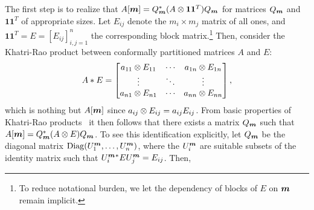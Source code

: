 \documentclass[11pt]{article}
\begin{document}
\vskip5pt
\noindent The first step is to realize that $A[\bm{m}] = Q_{\bm{m}}^*(A\otimes \bm{11}^T)Q_{\bm{m}}$ for matrices $Q_{\bm{m}}$ and $\bm{11}^T$ of appropriate sizes. Let $E_{ij}$ denote the $m_i \times m_j$ matrix of all ones, and $\bm{11}^T=E=[E_{ij}]_{i,j=1}^n$ the corresponding block matrix.\footnote{To reduce notational burden, we let the dependency of blocks of $E$ on $\bm{m}$ remain implicit.} Then, consider the Khatri-Rao product between conformally partitioned matrices $A$ and $E$:
\begin{equation}
  \label{eq:4}
  A \ast E =
  \begin{bmatrix}
    a_{11}\otimes E_{11} & \cdots  & a_{1n}\otimes E_{1n}\\
    \vdots & \ddots & \vdots \\
    a_{n1} \otimes E_{n1} & \cdots & a_{nn}\otimes E_{nn}
  \end{bmatrix},
\end{equation}
which is nothing but $A[\bm{m}]$ since $a_{ij}\otimes E_{ij} = a_{ij}E_{ij}$. From basic properties of Khatri-Rao products~\citep{liu2008} it then follows that there exists a matrix $Q_{\bm{m}}$ such that $A[\bm{m}]=Q_{\bm{m}}^*(A\otimes E)Q_{\bm{m}}$. To see this identification explicitly, let $Q_{\bm{m}}$ be the diagonal matrix $\operatorname{Diag}(U^{\bm{m}}_1,\ldots,U^{\bm{m}}_n)$, where the $U^{\bm{m}}_i$ are suitable subsets of the identity matrix such that $U^{\bm{m}}_i{}^*EU^{\bm{m}}_j=E_{ij}$. Then,
\end{document}
